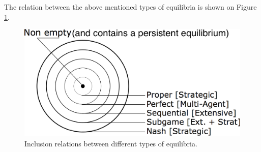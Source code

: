 The relation between the above mentioned types of  equilibria is shown on Figure \ref{ch5:fig:equilibriaRelation}.

\begin{figure}[!ht]
\centering
\includegraphics[scale=0.7]{equilibriaRelationMOD.png}
\caption{Inclusion relations between different types of equilibria.}
\label{ch5:fig:equilibriaRelation}
\end{figure}






\ifx \globalmark \undefined %


	
\else

\fi
